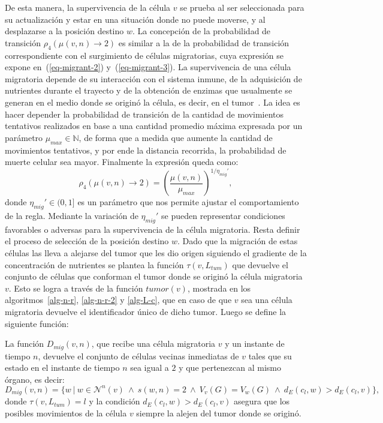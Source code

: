 De esta manera, la supervivencia de la c\'elula $v$ se prueba al ser seleccionada para su actualizaci\'on y estar en una situaci\'on donde no puede moverse, y al desplazarse a la posici\'on destino $w$. La concepci\'on de la probabilidad de transici\'on $\rho_4(\mu(v,n) \rightarrow 2)$ es similar a la de la probabilidad de transici\'on correspondiente con el surgimiento de c\'elulas migratorias, cuya expresi\'on se expone en~(\ref{eq-migrant-2}) y~(\ref{eq-migrant-3}). La supervivencia de una c\'elula migratoria depende de su interacci\'on con el sistema inmune, de la adquisici\'on de nutrientes durante el trayecto y de la obtenci\'on de enzimas que usualmente se generan en el medio donde se origin\'o la c\'elula, es decir, en el tumor~\cite{migration}. La idea es hacer depender la probabilidad de transici\'on de la cantidad de movimientos tentativos realizados en base a una cantidad promedio m\'axima expresada por un par\'ametro $\mu_{max} \in \mathbb{N}$, de forma que a medida que aumente la cantidad de movimientos tentativos, y por ende la distancia recorrida, la probabilidad de muerte celular sea mayor. Finalmente la expresi\'on queda como:
\begin{equation}
\rho_4(\mu(v,n) \rightarrow 2) = \left(\displaystyle\frac{\mu(v,n)}{\mu_{max}} \right)^{\displaystyle 1 / \eta_{mig}'}, \label{eq-rho-4}
\end{equation}
donde $\eta_{mig}' \in (0,1]$ es un par\'ametro que nos permite ajustar el comportamiento de la regla. Mediante la variaci\'on de $\eta_{mig}'$ se pueden representar condiciones favorables o adversas para la supervivencia de la c\'elula migratoria. Resta definir el proceso de selecci\'on de la posici\'on destino $w$. Dado que la migraci\'on de estas c\'elulas las lleva a alejarse del tumor que les dio origen siguiendo el gradiente de la concentraci\'on de nutrientes se plantea la funci\'on $\tau(v,L_{tum})$ que devuelve el conjunto de c\'elulas que conforman el tumor donde se origin\'o la c\'elula migratoria $v$. Esto se logra a trav\'es de la funci\'on $tumor(v)$, mostrada en los algoritmos~\ref{alg-n-r}, \ref{alg-n-r-2} y \ref{alg-L-c}, que en caso de que $v$ sea una c\'elula migratoria devuelve el identificador \'unico de dicho tumor. Luego se define la siguiente funci\'on:

\begin{definition}
\label{def-type-neighbours}
La funci\'on $D_{mig}(v,n)$, que recibe una c\'elula migratoria $v$ y un instante de tiempo $n$, devuelve el conjunto de c\'elulas vecinas inmediatas de $v$ tales que su estado en el instante de tiempo $n$ sea igual a $2$ y que pertenezcan al mismo \'organo, es decir:
\begin{equation}
D_{mig}(v,n) = \lbrace w~|~w \in \mathcal{N}^n(v)~\wedge~s(w,n)=2~\wedge~V_v(G) = V_w(G)~\wedge~d_E(c_l,w) > d_E(c_l,v) \rbrace, \label{eq-type-neighbours}
\end{equation}
donde $\tau(v,L_{tum}) = l$ y la condici\'on $d_E(c_l,w) > d_E(c_l,v)$ asegura que los posibles movimientos de la c\'elula $v$ siempre la alejen del tumor donde se origin\'o.
\end{definition}


